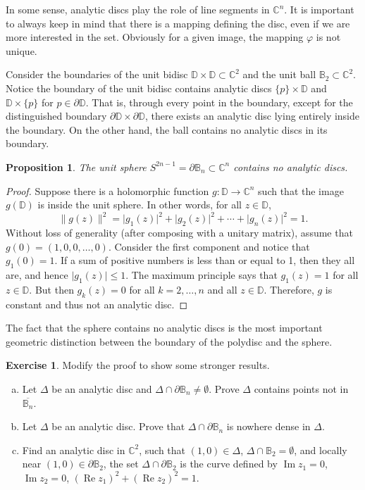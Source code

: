 \documentclass[12pt,openany]{book}
\renewcommand{\Re}{\operatorname{Re}}
\renewcommand{\Im}{\operatorname{Im}}
\newcommand{\sabs}[1]{\lvert {#1} \rvert}
\newcommand{\snorm}[1]{\lVert {#1} \rVert}
\newcommand{\C}{{\mathbb{C}}}
\newcommand{\D}{{\mathbb{D}}}
\newcommand{\bB}{{\mathbb{B}}}
\theoremstyle{plain}
\newtheorem{prop}[thm]{Proposition}
\theoremstyle{remark}
\theoremstyle{definition}
\newenvironment{exbox}{%
    \def\FrameCommand{\vrule width 1pt \relax\hspace{10pt}}%
    \MakeFramed{\advance\hsize-\width\FrameRestore}%
}{%
    \endMakeFramed
}
\newenvironment{exparts}{%
    \leavevmode\begin{enumerate}[a),noitemsep,topsep=0pt,parsep=0pt,partopsep=0pt]
}{%
    \end{enumerate}
}
\theoremstyle{exercise}
\newtheorem{exercise}{Exercise}[section]
\theoremstyle{example}
\begin{document}
In some sense, analytic discs play the role of line segments in $\C^n$.  It
is important to always keep in mind that there is a mapping defining the
disc, even if we are more interested in the set.  Obviously for a given
image, the mapping $\varphi$ is not unique.

Consider the boundaries of
the unit bidisc $\D \times \D \subset \C^2$
and the unit ball $\bB_2 \subset \C^2$.
Notice the boundary of the unit bidisc contains analytic discs
$\{p\} \times \D$
and $\D \times \{p\}$ for $p \in \partial \D$.
That is, through every point in the boundary, except for the distinguished
boundary $\partial \D \times \partial \D$, there exists an analytic disc
lying entirely inside the boundary.  On the other hand, the ball
contains no analytic discs in its boundary.

\begin{prop}\label{prop:noanaldiscinsphere}
%
The unit sphere $S^{2n-1} = \partial \bB_n \subset \C^n$
contains no analytic discs.
\end{prop}

\begin{proof}
Suppose there is a holomorphic function $g \colon \D \to \C^n$
such that the image $g(\D)$ is inside the unit sphere.  In other words,
for all $z \in \D$,
\begin{equation*}
\snorm{g(z)}^2
= \sabs{g_1(z)}^2 + \sabs{g_2(z)}^2 + \cdots + \sabs{g_n(z)}^2 = 1 .
\end{equation*}
Without loss of generality (after composing with a unitary matrix),
assume that $g(0) = (1,0,0,\ldots,0)$.
Consider the first component and notice that $g_1(0) = 1$.
If a sum of positive numbers is less than or equal to 1,
then they all are, and hence $\sabs{g_1(z)} \leq 1$.
The maximum principle says
that $g_1(z) = 1$ for all $z \in \D$.  But then $g_k(z) = 0$
for all $k=2,\ldots,n$ and all $z \in \D$.  Therefore, $g$ is constant and
thus not an analytic disc.
\end{proof}

The fact that the sphere contains no analytic discs
is the most important geometric distinction between the boundary of
the polydisc and the sphere.

\begin{exbox}
\begin{exercise}
Modify the proof to show some stronger results.
\begin{exparts}
\item
Let $\Delta$ be an analytic disc
and $\Delta \cap \partial \bB_n \not= \emptyset$.
Prove $\Delta$ contains points not in
$\overline{\bB_n}$.
\item
Let $\Delta$ be an analytic disc.
Prove that $\Delta \cap \partial \bB_n$ is nowhere dense in $\Delta$.
\item
Find an analytic disc in $\C^2$, such that $(1,0) \in \Delta$, $\Delta \cap \bB_2 =
\emptyset$, and locally near
$(1,0) \in \partial \bB_2$, the set
$\Delta \cap \partial \bB_2$ is the
curve defined by $\Im z_1=0$, $\Im z_2=0$,
${(\Re z_1)}^2+ {(\Re z_2)}^2 = 1$.
\end{exparts}
\end{exercise}
\end{exbox}
\end{document}
